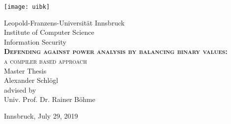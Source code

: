 \begin{titlepage}

    \begin{center}

        \texttt{[image: uibk]}

        \large Leopold-Franzens-Universit\"at Innsbruck\\
        [0.5cm]  

        \large Institute of Computer Science\\Information Security\\
        [3cm]

        \textsc{\large\textbf{Defending against power analysis by balancing binary values:}\\a compiler based approach}\\
        Master Thesis\\
        [2cm]

        Alexander Schlögl\\
        [3.5cm]

        advised by\\
        Univ. Prof. Dr. Rainer Böhme\\

        \vfill

        Innsbruck, July 29, 2019

    \end{center}

\end{titlepage}



